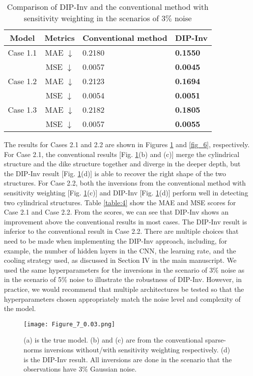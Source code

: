 \documentclass{article}
\begin{document}
\begin{table}[b!]
\centering
\caption{Comparison of DIP-Inv and the conventional method with sensitivity weighting in the scenarios of 3$\%$ noise}
\begin{tabular}{|c|c|l|l|}
\hline
Model & Metrics & Conventional method & DIP-Inv\\
\hline
Case 1.1 & MAE $\downarrow$ & 0.2180 & \textbf{0.1550}\\
 & MSE $\downarrow$ & 0.0057 & \textbf{0.0045}\\
\hline
Case 1.2 & MAE $\downarrow$ & 0.2123 & \textbf{0.1694}\\
 & MSE $\downarrow$ & 0.0054 & \textbf{0.0051}\\
\hline
Case 1.3 & MAE $\downarrow$ & 0.2182 & \textbf{0.1805}\\
 & MSE $\downarrow$ & 0.0057 & \textbf{0.0055}\\ 
\hline
\end{tabular}
\label{table:3}
\end{table}

The results for Cases 2.1 and 2.2 are shown in Figures \ref{fig_5} and \ref{fig_6}, respectively. For Case 2.1, the conventional results [Fig. \ref{fig_5}(b) and (c)] merge the cylindrical structure and the dike structure together and diverge in the deeper depth, but the DIP-Inv result [Fig. \ref{fig_5}(d)] is able to recover the right shape of the two structures. For Case 2.2, both the inversions from the conventional method with sensitivity weighting [Fig. \ref{fig_5}(c)] and DIP-Inv [Fig. \ref{fig_5}(d)] perform well in detecting two cylindrical structures. Table \ref{table:4} show the MAE and MSE scores for Case 2.1 and Case 2.2. From the scores, we can see that DIP-Inv shows an improvement above the conventional results in most cases. The DIP-Inv result is inferior to the conventional result in Case 2.2. 
There are multiple choices that need to be made when implementing the DIP-Inv approach, including, for example, the number of hidden layers in the CNN, the learning rate, and the cooling strategy used, as discussed in Section IV in the main manuscript. We used the same hyperparameters for the inversions in the scenario of 3$\%$ noise as in the scenario of 5$\%$ noise to illustrate the robustness of DIP-Inv. However, in practice, we would recommend that multiple architectures be tested so that the hyperparameters chosen appropriately match the noise level and complexity of the model.


\begin{figure}[h!]
\centering
\texttt{[image: Figure\_7\_0.03.png]}
\caption{(a) is the true model. (b) and (c) are from the conventional sparse-norms inversions without/with sensitivity weighting respectively. (d) is the DIP-Inv result. All inversions are done in the scenario that the observations have 3$\%$ Gaussian noise.}
\label{fig_5}
\end{figure} 
\end{document}
